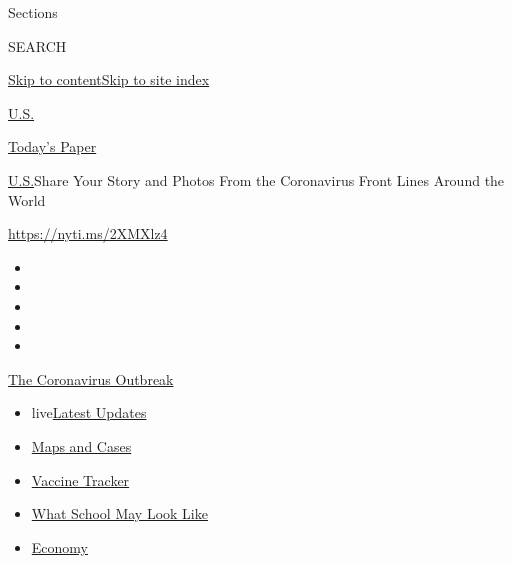 Sections

SEARCH

\protect\hyperlink{site-content}{Skip to
content}\protect\hyperlink{site-index}{Skip to site index}

\href{https://www.nytimes3xbfgragh.onion/section/us}{U.S.}

\href{https://myaccount.nytimes3xbfgragh.onion/auth/login?response_type=cookie\&client_id=vi}{}

\href{https://www.nytimes3xbfgragh.onion/section/todayspaper}{Today's
Paper}

\href{/section/us}{U.S.}\textbar{}Share Your Story and Photos From the
Coronavirus Front Lines Around the World

\url{https://nyti.ms/2XMXlz4}

\begin{itemize}
\item
\item
\item
\item
\item
\end{itemize}

\href{https://www.nytimes3xbfgragh.onion/news-event/coronavirus?action=click\&pgtype=Article\&state=default\&region=TOP_BANNER\&context=storylines_menu}{The
Coronavirus Outbreak}

\begin{itemize}
\tightlist
\item
  live\href{https://www.nytimes3xbfgragh.onion/2020/08/02/world/coronavirus-updates.html?action=click\&pgtype=Article\&state=default\&region=TOP_BANNER\&context=storylines_menu}{Latest
  Updates}
\item
  \href{https://www.nytimes3xbfgragh.onion/interactive/2020/us/coronavirus-us-cases.html?action=click\&pgtype=Article\&state=default\&region=TOP_BANNER\&context=storylines_menu}{Maps
  and Cases}
\item
  \href{https://www.nytimes3xbfgragh.onion/interactive/2020/science/coronavirus-vaccine-tracker.html?action=click\&pgtype=Article\&state=default\&region=TOP_BANNER\&context=storylines_menu}{Vaccine
  Tracker}
\item
  \href{https://www.nytimes3xbfgragh.onion/interactive/2020/07/29/us/schools-reopening-coronavirus.html?action=click\&pgtype=Article\&state=default\&region=TOP_BANNER\&context=storylines_menu}{What
  School May Look Like}
\item
  \href{https://www.nytimes3xbfgragh.onion/live/2020/07/31/business/stock-market-today-coronavirus?action=click\&pgtype=Article\&state=default\&region=TOP_BANNER\&context=storylines_menu}{Economy}
\end{itemize}

